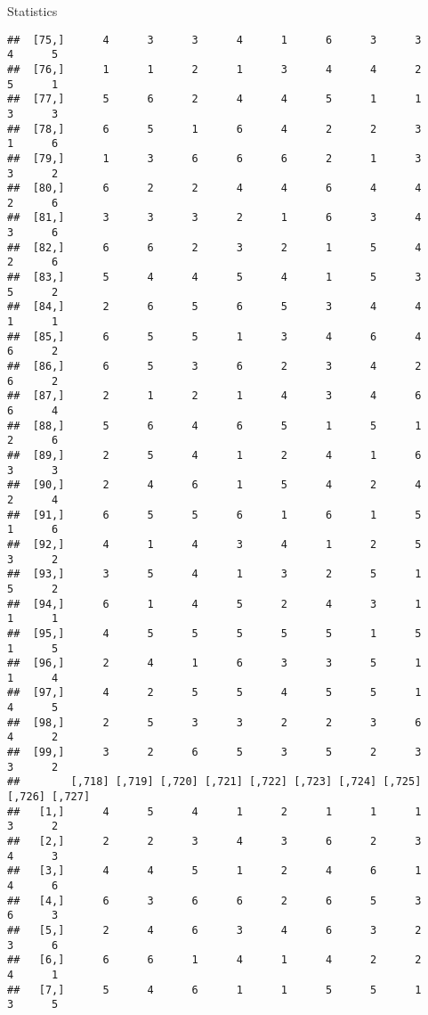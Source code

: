 \documentclass[
  ignorenonframetext,
]{beamer}
\begin{document}
\begin{frame}[fragile]{Statistics}
\begin{verbatim}
##  [75,]      4      3      3      4      1      6      3      3      4      5
##  [76,]      1      1      2      1      3      4      4      2      5      1
##  [77,]      5      6      2      4      4      5      1      1      3      3
##  [78,]      6      5      1      6      4      2      2      3      1      6
##  [79,]      1      3      6      6      6      2      1      3      3      2
##  [80,]      6      2      2      4      4      6      4      4      2      6
##  [81,]      3      3      3      2      1      6      3      4      3      6
##  [82,]      6      6      2      3      2      1      5      4      2      6
##  [83,]      5      4      4      5      4      1      5      3      5      2
##  [84,]      2      6      5      6      5      3      4      4      1      1
##  [85,]      6      5      5      1      3      4      6      4      6      2
##  [86,]      6      5      3      6      2      3      4      2      6      2
##  [87,]      2      1      2      1      4      3      4      6      6      4
##  [88,]      5      6      4      6      5      1      5      1      2      6
##  [89,]      2      5      4      1      2      4      1      6      3      3
##  [90,]      2      4      6      1      5      4      2      4      2      4
##  [91,]      6      5      5      6      1      6      1      5      1      6
##  [92,]      4      1      4      3      4      1      2      5      3      2
##  [93,]      3      5      4      1      3      2      5      1      5      2
##  [94,]      6      1      4      5      2      4      3      1      1      1
##  [95,]      4      5      5      5      5      5      1      5      1      5
##  [96,]      2      4      1      6      3      3      5      1      1      4
##  [97,]      4      2      5      5      4      5      5      1      4      5
##  [98,]      2      5      3      3      2      2      3      6      4      2
##  [99,]      3      2      6      5      3      5      2      3      3      2
##        [,718] [,719] [,720] [,721] [,722] [,723] [,724] [,725] [,726] [,727]
##   [1,]      4      5      4      1      2      1      1      1      3      2
##   [2,]      2      2      3      4      3      6      2      3      4      3
##   [3,]      4      4      5      1      2      4      6      1      4      6
##   [4,]      6      3      6      6      2      6      5      3      6      3
##   [5,]      2      4      6      3      4      6      3      2      3      6
##   [6,]      6      6      1      4      1      4      2      2      4      1
##   [7,]      5      4      6      1      1      5      5      1      3      5

\end{verbatim}
\end{frame}
\end{document}
